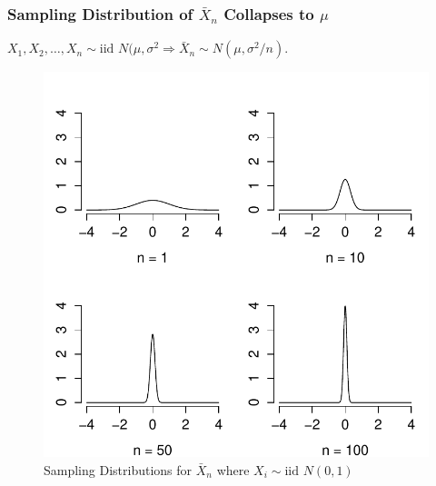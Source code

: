 

\begin{frame}
\frametitle{Sampling Distribution of $\bar{X}_n$ Collapses to $\mu$}
\alert{$X_1, X_2, \hdots, X_n \sim \mbox{iid } N(\mu,\sigma^2 \Rightarrow \bar{X}_n \sim N(\mu, \sigma^2/n)$.} \\
\begin{figure}
\centering
\includegraphics[scale = 0.5]{./images/normal_LLN_dist}
\caption{Sampling Distributions for $\bar{X}_n$ where $X_i \sim \mbox{iid } N(0,1)$}
\end{figure}

\end{frame}






